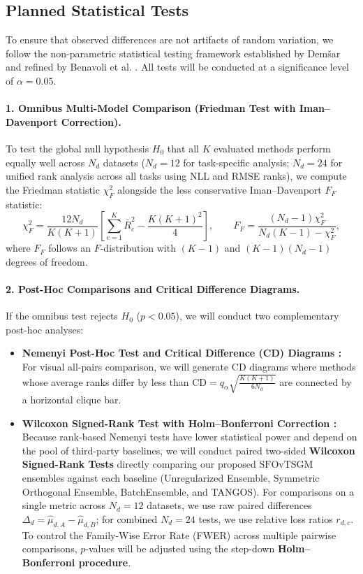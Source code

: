 \documentclass[11pt, a4paper]{article}
\begin{document}
\subsection{Planned Statistical Tests}
To ensure that observed differences are not artifacts of random variation, we follow the non-parametric statistical testing framework established by Dem\v{s}ar \cite{demsar2006statistical} and refined by Benavoli et al. \cite{benavoli2016should}. All tests will be conducted at a significance level of $\alpha = 0.05$.

\paragraph{1. Omnibus Multi-Model Comparison (Friedman Test with Iman--Davenport Correction).}
To test the global null hypothesis $H_0$ that all $K$ evaluated methods perform equally well across $N_d$ datasets ($N_d = 12$ for task-specific analysis; $N_d = 24$ for unified rank analysis across all tasks using NLL and RMSE ranks), we compute the Friedman statistic $\chi_F^2$ alongside the less conservative Iman--Davenport $F_F$ statistic:
\begin{equation}
    \chi_F^2 = \frac{12 N_d}{K(K+1)} \left[ \sum_{c=1}^{K} \bar{R}_c^2 - \frac{K(K+1)^2}{4} \right], \qquad 
    F_F = \frac{(N_d - 1)\chi_F^2}{N_d(K - 1) - \chi_F^2},
\end{equation}
where $F_F$ follows an $F$-distribution with $(K - 1)$ and $(K - 1)(N_d - 1)$ degrees of freedom.

\paragraph{2. Post-Hoc Comparisons and Critical Difference Diagrams.}
If the omnibus test rejects $H_0$ ($p < 0.05$), we will conduct two complementary post-hoc analyses:
\begin{itemize}
    \item \textbf{Nemenyi Post-Hoc Test and Critical Difference (CD) Diagrams \cite{demsar2006statistical}:} For visual all-pairs comparison, we will generate CD diagrams where methods whose average ranks differ by less than $\text{CD} = q_\alpha \sqrt{\frac{K(K+1)}{6 N_d}}$ are connected by a horizontal clique bar.
    \item \textbf{Wilcoxon Signed-Rank Test with Holm--Bonferroni Correction \cite{benavoli2016should}:} Because rank-based Nemenyi tests have lower statistical power and depend on the pool of third-party baselines, we will conduct paired two-sided \textbf{Wilcoxon Signed-Rank Tests} directly comparing our proposed $\text{SFOvTSGM}$ ensembles against each baseline (Unregularized Ensemble, Symmetric Orthogonal Ensemble, BatchEnsemble, and TANGOS). For comparisons on a single metric across $N_d = 12$ datasets, we use raw paired differences $\Delta_d = \hat{\mu}_{d,A} - \hat{\mu}_{d,B}$; for combined $N_d = 24$ tests, we use relative loss ratios $r_{d,c}$. To control the Family-Wise Error Rate (FWER) across multiple pairwise comparisons, $p$-values will be adjusted using the step-down \textbf{Holm--Bonferroni procedure}.
\end{itemize}
\end{document}
